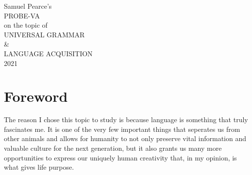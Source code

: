 \documentclass[a4paper,10pt]{article}
\begin{document}
\begingroup%
\centering
\vfill
\Large{Samuel Pearce's}\\
\huge{PROBE-VA}\\
\Large{on the topic of}\\[\baselineskip]
\Huge{UNIVERSAL GRAMMAR}\\
\huge{\&}\\
\Huge{LANGUAGE ACQUISITION}\\[\baselineskip]
\large{\scshape 2021}\par
\vfill\null
\endgroup

\begin{abstract}
	The goal of this project was twofold: for one half, I intended to expand my knowledge on
	the topic of Chomsky's Universal Grammar theory through the reading of an introductory book on
	the matter and writing a paper summarising my findings and opinion on the concept. For the other
	half, I conducted an informal experiment with two participants in which I taught them the language
	Toki Pona\footnotemark through two of the most common methods; one learned through pure immersion,
	while the other learned using the Toki Pona official course book. Finally, with the results of
	both halves of the project complete, I summarised my findings into three documents: the summary
	of the universal grammar introduction book, the review of the experiment results, and the
	account of how the project was conducted with a review of the process as a whole, which is
	this document.
\end{abstract}


\pagebreak


\tableofcontents
\pagebreak


\section{Foreword}
The reason I chose this topic to study is because language is something that truly fascinates me.
It is one of the very few important things that seperates us from other animals and allows for humanity
to not only preserve vital information and valuable culture for the next generation, but it also
grants us many more opportunities to express our uniquely human creativity that, in my opinion,
is what gives life purpose.
\end{document}
